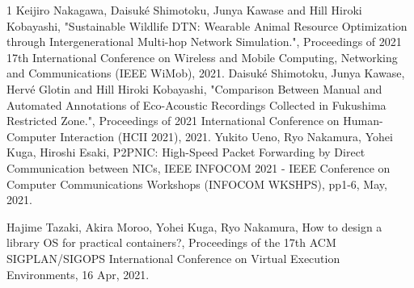 \begin{査読付}{1}
Keijiro Nakagawa, Daisuk\'e Shimotoku, Junya Kawase and Hill Hiroki Kobayashi, "Sustainable Wildlife DTN: Wearable Animal Resource Optimization through Intergenerational Multi-hop Network Simulation.", Proceedings of 2021 17th International Conference on Wireless and Mobile Computing, Networking and Communications (IEEE WiMob), 2021.
Daisuk\'e Shimotoku, Junya Kawase, Herv\'e Glotin and Hill Hiroki Kobayashi, "Comparison Between Manual and Automated Annotations of Eco-Acoustic Recordings Collected in Fukushima Restricted Zone.", Proceedings of 2021 International Conference on Human-Computer Interaction (HCII 2021), 2021.  
Yukito Ueno, Ryo Nakamura, Yohei Kuga, Hiroshi Esaki, P2PNIC: High-Speed Packet Forwarding by Direct Communication between NICs, IEEE INFOCOM 2021 - IEEE Conference on Computer Communications Workshops (INFOCOM WKSHPS), pp1-6, May, 2021.

Hajime Tazaki, Akira Moroo, Yohei Kuga, Ryo Nakamura, How to design a library OS for practical containers?, Proceedings of the 17th ACM SIGPLAN/SIGOPS International Conference on Virtual Execution Environments, 16 Apr, 2021.


\end{査読付}
